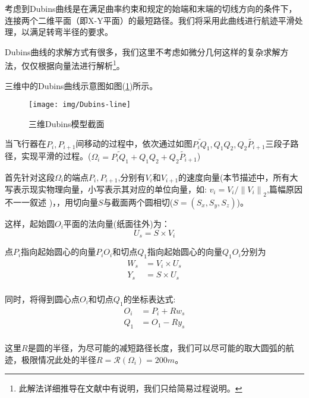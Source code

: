 考虑到Dubins曲线是在满足曲率约束和规定的始端和末端的切线方向的条件下，连接两个二维平面（即X-Y平面）的最短路径\cite{Dubins曲线简介}。我们将采用此曲线进行航迹平滑处理，以满足转弯半径的要求。

Dubins曲线的求解方式有很多，我们这里不考虑如微分几何这样的复杂求解方法，仅仅根据向量法进行解析\footnote{此解法详细推导在文献\cite{Dubins}中有说明，我们只给简易过程说明。}。

三维中的Dubins曲线示意图如图(\ref{fig:Dubins-line})所示。
\begin{figure}[h]
    \centering
    \texttt{[image: img/Dubins-line]}
    \caption{三维Dubins模型截面}
    \label{fig:Dubins-line}
\end{figure}

当飞行器在$P_i,P_{i+1}$间移动的过程中，依次通过如图$\widetilde{P_iQ_1},Q_1Q_2,\widetilde{Q_2P_{i+1}}$三段子路径，实现平滑的过程。($\Omega_{i} = \widetilde{P_iQ_1}+Q_1Q_2+\widetilde{Q_2P_{i+1}}$)

首先针对这段$ \Omega_{i}$的端点$P_i,P_{i+1}$,分别有$V_i $和$V_{i+1} $的速度向量(本节描述中，所有大写表示现实物理向量，小写表示其对应的单位向量，如: $v_i = V_i /\left \| V_i \right \|_2 $,篇幅原因不一一叙述 )，，用切向量$S$与截面两个圆相切($S=(S_x,S_y,S_z)$)。

这样，起始圆$O_i$平面的法向量(纸面往外)为：
\begin{equation}
    U_s = S \times V_i
\end{equation}

点$P_i$指向起始圆心的向量$P_iO_i$和切点$Q_1$指向起始圆心的向量$Q_1O_i$分别为
\begin{equation}
\begin{aligned}
W_s & = V_i \times U_s \\
Y_s & = S \times U_s \\
\end{aligned}
\end{equation}

同时，将得到圆心点$O_i$和切点$Q_1$的坐标表达式:
\begin{equation}
\begin{aligned}
O_i & = P_i + R  w_s \\
Q_1 & = O_1 - R  y_s \\
\end{aligned}
\end{equation}

这里$R$是圆的半径，为尽可能的减短路径长度，我们可以尽可能的取大圆弧的航迹，极限情况此处的半径$R = \mathcal{R}(\Omega_{i}) = 200m$。

